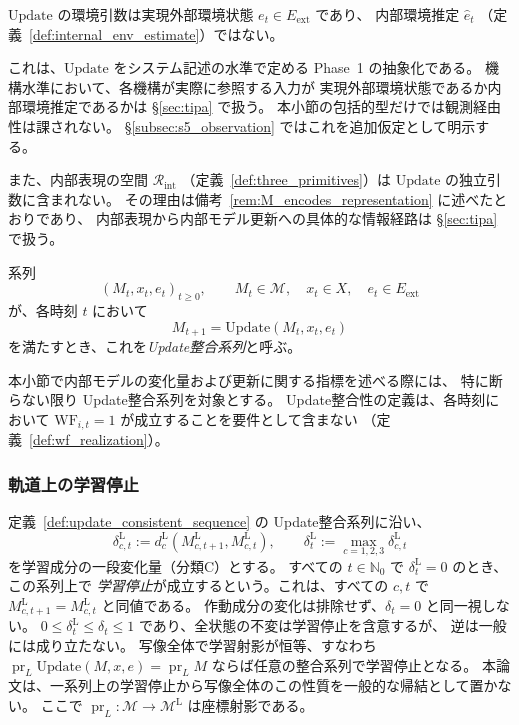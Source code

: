 \begin{remark}
\label{rem:update_env_argument}
$\mathrm{Update}$ の環境引数は実現外部環境状態
$e_t\in E_{\mathrm{ext}}$ であり、
内部環境推定 $\hat{e}_t$
（定義~\ref{def:internal_env_estimate}）ではない。

これは、$\mathrm{Update}$ をシステム記述の水準で定める
Phase~1 の抽象化である。
機構水準において、各機構が実際に参照する入力が
実現外部環境状態であるか内部環境推定であるかは
\S\ref{sec:tipa} で扱う。
本小節の包括的型だけでは観測経由性は課されない。
\S\ref{subsec:s5_observation} ではこれを追加仮定として明示する。

また、内部表現の空間
$\mathcal{R}_{\mathrm{int}}$
（定義~\ref{def:three_primitives}）は
$\mathrm{Update}$ の独立引数に含まれない。
その理由は備考~\ref{rem:M_encodes_representation} に述べたとおりであり、
内部表現から内部モデル更新への具体的な情報経路は
\S\ref{sec:tipa} で扱う。
\end{remark}

\begin{definition}[Update整合系列]
\label{def:update_consistent_sequence}

系列
\[
  (M_t,x_t,e_t)_{t\geq0},
  \qquad
  M_t\in\mathcal{M},\quad
  x_t\in X,\quad
  e_t\in E_{\mathrm{ext}}
\]
が、各時刻 $t$ において
\[
  M_{t+1}
  =
  \mathrm{Update}(M_t,x_t,e_t)
\]
を満たすとき、これを\emph{Update整合系列}と呼ぶ。

本小節で内部モデルの変化量および更新に関する指標を述べる際には、
特に断らない限り Update整合系列を対象とする。
Update整合性の定義は、各時刻において
$\mathrm{WF}_{i,t}=1$ が成立することを要件として含まない
（定義~\ref{def:wf_realization}）。
\end{definition}

\subsubsection{軌道上の学習停止}

\begin{definition}[系列上の学習停止]
\label{def:update_stop_on_trajectory}
定義~\ref{def:update_consistent_sequence} の Update整合系列に沿い、
\[
\delta^{\mathrm L}_{c,t}:=d_c^{\mathrm L}(M^{\mathrm L}_{c,t+1},M^{\mathrm L}_{c,t}),\qquad
\delta^{\mathrm L}_t:=\max_{c=1,2,3}\delta^{\mathrm L}_{c,t}
\]
を学習成分の一段変化量（分類C）とする。
すべての $t\in\mathbb N_0$ で $\delta^{\mathrm L}_t=0$ のとき、この系列上で
\emph{学習停止}が成立するという。これは、すべての $c,t$ で
$M^{\mathrm L}_{c,t+1}=M^{\mathrm L}_{c,t}$ と同値である。
作動成分の変化は排除せず、$\delta_t=0$ と同一視しない。
$0\le\delta^{\mathrm L}_t\le\delta_t\le1$ であり、全状態の不変は学習停止を含意するが、
逆は一般には成り立たない。
写像全体で学習射影が恒等、すなわち
$\operatorname{pr}_L\mathrm{Update}(M,x,e)=\operatorname{pr}_L M$
ならば任意の整合系列で学習停止となる。
本論文は、一系列上の学習停止から写像全体のこの性質を一般的な帰結として置かない。
ここで $\operatorname{pr}_L:\mathcal M\to\mathcal M^{\mathrm L}$ は座標射影である。
\end{definition}

